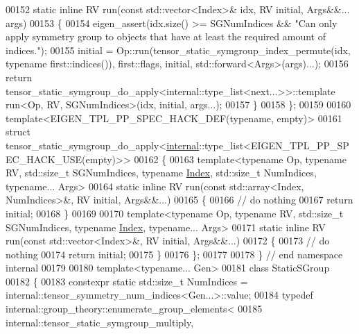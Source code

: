 \begin{DoxyCode}
00152   \textcolor{keyword}{static} \textcolor{keyword}{inline} RV run(\textcolor{keyword}{const} std::vector<Index>& idx, RV initial, Args&&... args)
00153   \{
00154     eigen\_assert(idx.size() >= SGNumIndices && \textcolor{stringliteral}{"Can only apply symmetry group to objects that have at least
       the required amount of indices."});
00155     initial = Op::run(tensor\_static\_symgroup\_index\_permute(idx, \textcolor{keyword}{typename} first::indices()), first::flags, 
      initial, std::forward<Args>(args)...);
00156     \textcolor{keywordflow}{return} tensor\_static\_symgroup\_do\_apply<internal::type\_list<next...>>::template run<Op, RV,
       SGNumIndices>(idx, initial, args...);
00157   \}
00158 \};
00159 
00160 \textcolor{keyword}{template}<EIGEN\_TPL\_PP\_SPEC\_HACK\_DEF(\textcolor{keyword}{typename}, empty)>
00161 \textcolor{keyword}{struct }tensor\_static\_symgroup\_do\_apply<\hyperlink{namespaceinternal}{internal}::type\_list<EIGEN\_TPL\_PP\_SPEC\_HACK\_USE(empty)>>
00162 \{
00163   \textcolor{keyword}{template}<\textcolor{keyword}{typename} Op, \textcolor{keyword}{typename} RV, std::size\_t SGNumIndices, \textcolor{keyword}{typename} \hyperlink{namespace_eigen_a62e77e0933482dafde8fe197d9a2cfde}{Index}, std::size\_t NumIndices,
       \textcolor{keyword}{typename}... Args>
00164   \textcolor{keyword}{static} \textcolor{keyword}{inline} RV run(\textcolor{keyword}{const} std::array<Index, NumIndices>&, RV initial, Args&&...)
00165   \{
00166     \textcolor{comment}{// do nothing}
00167     \textcolor{keywordflow}{return} initial;
00168   \}
00169 
00170   \textcolor{keyword}{template}<\textcolor{keyword}{typename} Op, \textcolor{keyword}{typename} RV, std::size\_t SGNumIndices, \textcolor{keyword}{typename} \hyperlink{namespace_eigen_a62e77e0933482dafde8fe197d9a2cfde}{Index}, \textcolor{keyword}{typename}... Args>
00171   \textcolor{keyword}{static} \textcolor{keyword}{inline} RV run(\textcolor{keyword}{const} std::vector<Index>&, RV initial, Args&&...)
00172   \{
00173     \textcolor{comment}{// do nothing}
00174     \textcolor{keywordflow}{return} initial;
00175   \}
00176 \};
00177 
00178 \} \textcolor{comment}{// end namespace internal}
00179 
00180 \textcolor{keyword}{template}<\textcolor{keyword}{typename}... Gen>
00181 \textcolor{keyword}{class }StaticSGroup
00182 \{
00183     constexpr \textcolor{keyword}{static} std::size\_t NumIndices = internal::tensor\_symmetry\_num\_indices<Gen...>::value;
00184     \textcolor{keyword}{typedef} internal::group\_theory::enumerate\_group\_elements<
00185       internal::tensor\_static\_symgroup\_multiply,

\end{DoxyCode}
